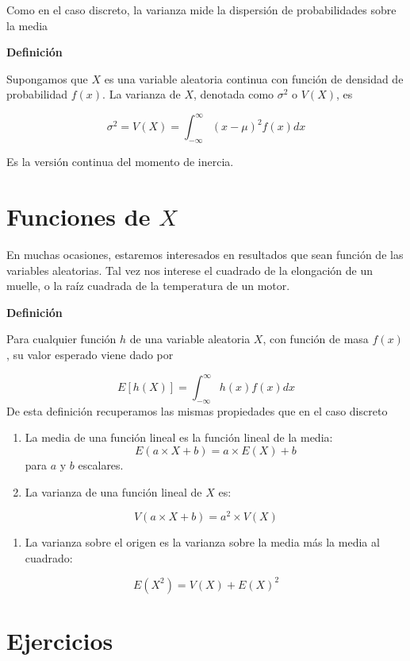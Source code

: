 \documentclass[
]{book}
\providecommand{\tightlist}{%
  \setlength{\itemsep}{0pt}\setlength{\parskip}{0pt}}
\begin{document}
Como en el caso discreto, la varianza mide la dispersión de probabilidades sobre la media

\textbf{Definición}

Supongamos que \(X\) es una variable aleatoria continua con función de densidad de probabilidad \(f(x)\). La varianza de \(X\), denotada como \(\sigma^2\) o \(V(X)\), es

\[\sigma^2=V(X)=\int_{-\infty}^\infty (x-\mu)^2 f(x) dx\]

Es la versión continua del momento de inercia.

\hypertarget{funciones-de-x}{%
\section{\texorpdfstring{Funciones de \(X\)}{Funciones de X}}\label{funciones-de-x}}

En muchas ocasiones, estaremos interesados en resultados que sean función de las variables aleatorias. Tal vez nos interese el cuadrado de la elongación de un muelle, o la raíz cuadrada de la temperatura de un motor.

\textbf{Definición}

Para cualquier función \(h\) de una variable aleatoria \(X\), con función de masa \(f(x)\), su valor esperado viene dado por

\[E[h(X)]= \int_{-\infty}^{\infty} h(x) f(x)dx\]
De esta definición recuperamos las mismas propiedades que en el caso discreto

\begin{enumerate}
\def\labelenumi{\arabic{enumi})}
\item
  La media de una función lineal es la función lineal de la media: \[ E( a\times X +b)= a\times E(X) +b\] para \(a\) y \(b\) escalares.
\item
  La varianza de una función lineal de \(X\) es:
\end{enumerate}

\[V(a\times X +b)= a^2\times V(X)\]

\begin{enumerate}
\def\labelenumi{\arabic{enumi})}
\setcounter{enumi}{2}
\tightlist
\item
  La varianza sobre el origen es la varianza sobre la media más la media al cuadrado:
\end{enumerate}

\[E(X^2)= V(X)+E(X)^2\]

\hypertarget{ejercicios-4}{%
\section{Ejercicios}\label{ejercicios-4}}
\end{document}

